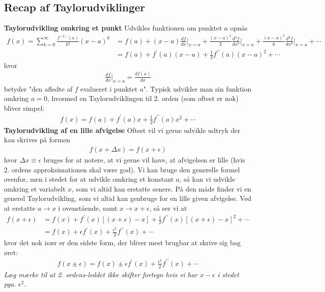\documentclass[a4paper]{article}
\begin{document}
    \subsection{Recap af Taylorudviklinger}
    \textbf{Taylorudvikling omkring et punkt}
    Udvikles funktionen om punktet \(a\) opnås  
    \begin{align*}
        f(x) = \sum_{k = 0}^\infty \frac{f^{(k)}(a)}{k!} (x-a)^k &= f(a) + (x-a)\frac{df}{dx}\Bigr|_{x = a} + \frac{(x-a)^2}{2} \frac{d^2 f}{dx^2}\Bigr|_{x = a} + \frac{(x-a)^3}{6} \frac{d^3 f}{dx^3}\Bigr|_{x = a} + \cdots\\
        &= f(a) + f^{\prime} (a) (x-a) + \frac{1}{2}f^{\prime\prime} (a) (x - a) ^2 + \cdots
    \end{align*}
    hvor \begin{align*}
        \frac{df}{dx}\Bigr|_{x = a} = \frac{df(a)}{dx}
    \end{align*}
    betyder "den afledte af \(f\) evalueret i punktet \(a\)". Typisk udvikler man sin funktion omkring \(a = 0\), hvormed en Taylorudviklingen til 2. orden (som oftest er nok) bliver simpel:
    \begin{align*}
        f(x) = f(a) + f^{\prime} (a) x + \frac{1}{2}f^{\prime\prime} (a) x^2 + \cdots
    \end{align*} 
    \textbf{Taylorudvikling af en lille afvigelse}
    Oftest vil vi gerne udvikle udtryk der kan skrives på formen \begin{align*}
        f(x + \Delta x) = f(x + \epsilon)
    \end{align*}
    hvor \(\Delta x \equiv \epsilon\) bruges for at notere, at vi gerne vil have, at afvigelsen er lille (hvis 2. ordens approksimationen skal være god). Vi kan bruge den generelle formel ovenfor, men i stedet for at udvikle omkring et konstant \(a\), så kan vi udvikle omkring et variabelt \(x\), som vi altid kan erstatte senere. På den måde finder vi en generel Taylorudvikling, som vi altid kan genbruge for en lille given afvigelse. Ved at erstatte \(a \to x\) i ovenstående, samt \(x \to x + \epsilon\), så ser vi at
    \begin{align*}
        f(x + \epsilon) &= f(x) + f^{\prime} (x) \left[(x + \epsilon) - x\right] + \frac{1}{2}f^{\prime\prime} (x) \left[(x + \epsilon) - x \right] ^2 + \cdots\\
        &= f(x) + \epsilon f^{\prime} (x) + \frac{\epsilon^{2}}{2} f^{\prime\prime} (x) + \cdots
    \end{align*}
    hvor det nok især er den sidste form, der bliver mest brugbar at skrive sig bag øret: \begin{align*}
        \boxed{f(x \pm \epsilon) = f(x) \pm \epsilon f^{\prime} (x) + \frac{\epsilon ^{2} }{2} f^{\prime\prime} (x) + \cdots}
    \end{align*}
    \textit{Læg mærke til at 2. ordens-leddet ikke skifter fortegn hvis vi har \(x - \epsilon\) i stedet pga. \(\epsilon ^{2}\)}.
\end{document}
